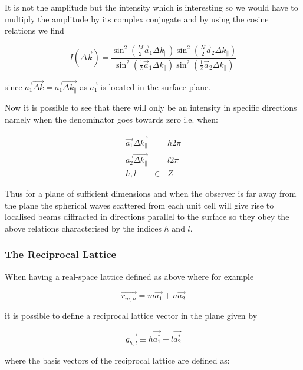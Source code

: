 It is not the amplitude but the intensity which is interesting so we would have to multiply the amplitude by its complex conjugate and by using the cosine relations we find

\begin{equation}
I(\Delta \vec{k}) = \frac{\sin^2\left(\frac{M}{2}\vec{a}_1 \Delta k_{\parallel}\right) \sin^2\left(\frac{N}{2}\vec{a}_2 \Delta k_{\parallel}\right)}{\sin^2\left(\frac{1}{2}\vec{a}_1 \Delta k_{\parallel}\right) \sin^2\left(\frac{1}{2}\vec{a}_2 \Delta k_{\parallel}\right)}
\end{equation}

\noindent since $\vec{a_1}\vec{\Delta k}=\vec{a_1}\vec{\Delta k_{\parallel}}$ as $\vec{a_1}$ is located in the surface plane.

Now it is possible to see that there will only be an intensity in specific directions namely when the denominator goes towards zero i.e. when:

\begin{eqnarray}
\vec{a_1}\vec{\Delta k_{\parallel}}	& =	& h2\pi \\
\vec{a_2}\vec{\Delta k_{\parallel}} & =	& l2\pi \\
h,l	& \in	& Z
\end{eqnarray}

Thus for a plane of sufficient dimensions and when the observer is far away from the plane the spherical waves scattered from each unit cell will give rise to localised beams diffracted in directions parallel to the surface so they obey the above relations characterised by the indices $h$ and $l$.

\subsubsection{The Reciprocal Lattice}
When having a real-space lattice defined as above where for example

\begin{equation}
\vec{r_{m,n}}=m\vec{a_1}+n\vec{a_2}
\end{equation}

\noindent it is possible to define a reciprocal lattice vector in the plane given by

\begin{equation}
\vec{g_{h,l}}\equiv h\vec{a_1^*}+l\vec{a_2^*}
\end{equation}

\noindent where the basis vectors of the reciprocal lattice are defined as:

